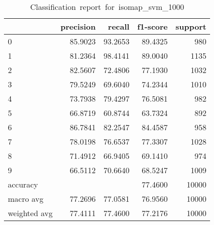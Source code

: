 \begin{table}[htb!]
    \centering
    \begin{tabular}{lrrrr}
        \toprule
                     & precision & recall  & f1-score & support \\
        \midrule
        0            & 85.9023   & 93.2653 & 89.4325  & 980     \\
        1            & 81.2364   & 98.4141 & 89.0040  & 1135    \\
        2            & 82.5607   & 72.4806 & 77.1930  & 1032    \\
        3            & 79.5249   & 69.6040 & 74.2344  & 1010    \\
        4            & 73.7938   & 79.4297 & 76.5081  & 982     \\
        5            & 66.8719   & 60.8744 & 63.7324  & 892     \\
        6            & 86.7841   & 82.2547 & 84.4587  & 958     \\
        7            & 78.0198   & 76.6537 & 77.3307  & 1028    \\
        8            & 71.4912   & 66.9405 & 69.1410  & 974     \\
        9            & 66.5112   & 70.6640 & 68.5247  & 1009    \\
        accuracy     &           &         & 77.4600  & 10000   \\
        macro avg    & 77.2696   & 77.0581 & 76.9560  & 10000   \\
        weighted avg & 77.4111   & 77.4600 & 77.2176  & 10000   \\
        \bottomrule
    \end{tabular}
    \caption{Classification\ report\ for\ isomap\_svm\_1000}
    \label{tab:classification-report-isomap_svm_1000}
\end{table}
